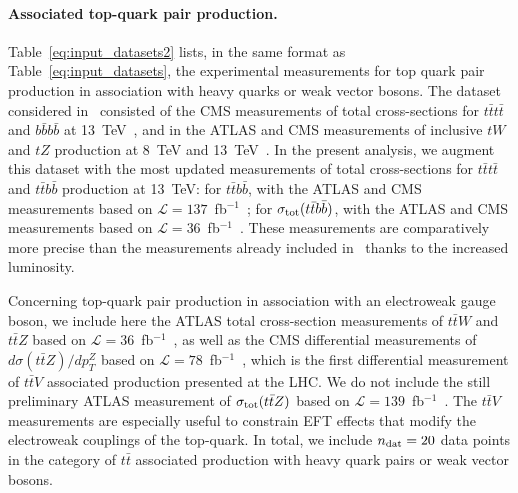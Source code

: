 \paragraph{Associated top-quark pair production.}
%
Table~\ref{eq:input_datasets2} lists, in the same format as
Table~\ref{eq:input_datasets}, the experimental measurements for top
quark pair production in association with heavy quarks or weak vector bosons.
%
The dataset considered in~\cite{Hartland:2019bjb} consisted of
the CMS measurements of total cross-sections for $t\bar{t}t\bar{t}$
and $b\bar{b}b\bar{b}$ at 13~TeV~\cite{Sirunyan:2017snr,Sirunyan:2017roi},
and in the ATLAS and CMS measurements of inclusive $tW$ and $tZ$ production at
8~TeV and 13~TeV~\cite{Khachatryan:2015sha,Sirunyan:2017uzs,Aad:2015eua,
  Aaboud:2016xve}.
%
In the present analysis, we augment this dataset with the most updated
measurements of total cross-sections for $t\bar{t}t\bar{t}$ and
$t\bar{t}b\bar{b}$ production at 13~TeV: for $t\bar{t}b\bar{b}$, with the ATLAS
and CMS measurements based on
$\mathcal{L}=137$~fb$^{-1}$~\cite{Sirunyan:2019wxt,Aad:2020klt};
for $\sigma_{\rm tot}(t\bar{t}b\bar{b})$, with the ATLAS and CMS measurements
based on $\mathcal{L}=36$~fb$^{-1}$~\cite{Aaboud:2018eki,Sirunyan:2019jud}.
These measurements are comparatively more precise than the measurements
already included in~\cite{Hartland:2019bjb} thanks to the increased luminosity.

Concerning top-quark pair production in association with an electroweak gauge
boson, we include here the ATLAS total cross-section measurements of
$t\bar{t}W$ and $t\bar{t}Z$ based on
$\mathcal{L}=36$~fb$^{-1}$~\cite{Aaboud:2019njj},
as well as the CMS differential
measurements of $d\sigma(t\bar{t}Z)/dp_T^Z$ based on
$\mathcal{L}=78$~fb$^{-1}$~\cite{CMS:2019too}, which
is the first differential measurement of $t\bar{t}V$ associated production
presented at the LHC. We do not include the still preliminary
ATLAS measurement of $\sigma_{\rm tot}(t\bar{t}Z)$ based on
$\mathcal{L}=139$~fb$^{-1}$~\cite{ATLAS-CONF-2020-028}.
%
The $t\bar{t}V$ measurements are
especially useful to constrain EFT effects that modify the electroweak
couplings of the top-quark.
%
In total, we include $n_{\rm dat}=20$
data points in the category of $t\bar{t}$ associated production with heavy quark pairs
or weak vector bosons.



